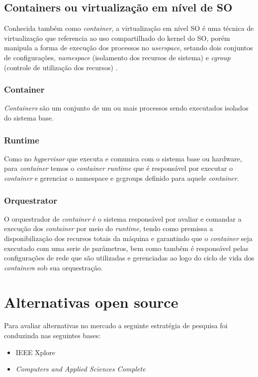 \subsection{Containers ou virtualização em nível de SO}

Conhecida também como \emph{container}, a virtualização em nível SO é uma técnica de virtualização que referencia ao uso compartilhado do kernel do SO, porém manipula a forma de execução dos processos no \emph{userspace}, setando dois conjuntos de configurações, \emph{namespace} (isolamento dos recursos de sistema) e \emph{cgroup} (controle de utilização dos recursos) \cite{redhat2018}.
\subsubsection{Container}
\emph{Containers} são um conjunto de um ou mais processos sendo executados isolados do sistema base.

\subsubsection{Runtime}
Como no \emph{hypervisor} que executa e comunica com o sistema base ou hardware, para \emph{container} temos o \emph{container} \emph{runtime} que é responsável por executar o \emph{container} e gerenciar o namespace e gcgroups definido para aquele \emph{container}.

\subsubsection{Orquestrator}
O orquestrador de \emph{container} é o sistema responsável por avaliar e comandar a execução dos \emph{container} por meio do \emph{runtime}, tendo como premissa a disponibilização dos recursos totais da máquina e garantindo que o \emph{container} seja executado com uma  serie de parâmetros, bem como também é responsável pelas configurações de rede que são utilizadas e gerenciadas ao logo do ciclo de vida dos \emph{container}s sob sua orquestração.

\section{Alternativas open source}

Para avaliar alternativas no mercado a seguinte estratégia de pesquisa foi conduzinda nas seguintes bases:

\begin{itemize}
    \item IEEE Xplore
    \item \emph{Computers and Applied Sciences Complete}
\end{itemize}

